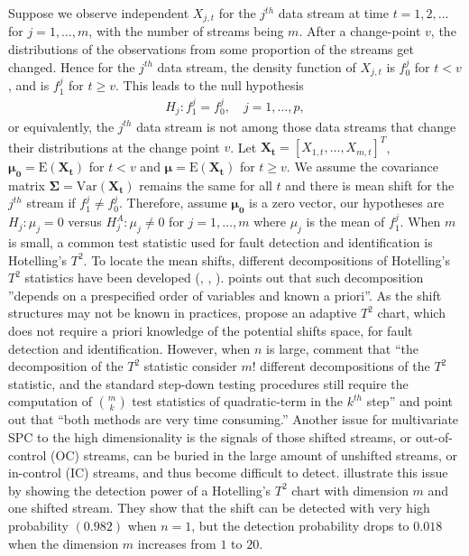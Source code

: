 \documentclass[]{interact}
\theoremstyle{plain}%
\theoremstyle{definition}
\theoremstyle{remark}
\newcommand{\E}{\mathrm{E}}
\newcommand{\Var}{\mathrm{Var}}
\begin{document}
Suppose we observe independent $X_{j,t}$ for the $j^{th}$ data stream at time $t = 1, 2, \ldots $ for $j = 1, \ldots, m$, with the number of streams being $m$. After a change-point $v$, the distributions of the observations from some proportion of the streams get changed. Hence for the $j^{th}$ data stream, the density function of $X_{j,t}$ is $f_0^{j}$ for $t<v$, and is $f_1^j$ for $t \ge v $. This leads to the null hypothesis 
\begin{align}
H_j: f_1^j = f_0^j,\quad j=1,\ldots,p, \label{p Hj}
\end{align}
or equivalently, the $j^{th}$ data stream is not among those data streams that change their distributions at the change point $v$. Let $\mathbf{X_t} = [X_{1,t}, \ldots, X_{m,t}]^T$, $\bm{\mu_0} = \E(\mathbf{X_t})$ for $t<v$ and $\bm{\mu} = \E(\mathbf{X_t})$ for $t\ge v$. We assume the covariance matrix $\bm{\Sigma} = \Var(\mathbf{X_t})$ remains the same for all $t$ and there is mean shift for the $j^{th}$ stream if $f_1^j \ne f_0^j$. Therefore, assume $\bm{\mu_0}$ is a zero vector, our hypotheses are $H_{j}: \mu_{j} = 0$ versus $H_{j}^A: \mu_{j} \ne 0$ for $j = 1, \ldots, m$ where $\mu_j$ is the mean of $f_1^j$. When $m$ is small, a common test statistic used for fault detection and identification is Hotelling's $T^2$. To locate the mean shifts, different decompositions of Hotelling's $T^2$ statistics have been developed (\cite{mason1995decomposition}, \cite{mason1997practical}, \cite{li2008causation}). \cite{zhu2009adaptive} points out that such decomposition ''depends on a prespecified order of variables and known a priori''. As the shift structures may not be known in practices, \cite{zhu2009adaptive} propose an adaptive $T^2$ chart, which does not require a priori knowledge of the potential shifts space, for fault detection and identification. However, when $n$ is large, \cite{li2020diagnostic} comment that 	``the decomposition of the $T^2$ statistic consider $m!$ different decompositions of the $T^2$ statistic, and the standard step-down testing procedures still require the computation of $\binom{m}{k}$ test statistics of quadratic-term in the $k^{th}$ step'' and point out that ``both methods are very time consuming.'' Another issue for multivariate SPC to the high dimensionality is the signals of those shifted streams, or out-of-control (OC) streams, can be buried in the large amount of unshifted streams, or in-control (IC) streams, and thus become difficult to detect. \cite{wang2009high} illustrate this issue by showing the detection power of a Hotelling's $T^2$ chart with dimension $m$ and one shifted stream. They show that the shift can be detected with very high probability $(0.982)$ when $n=1$, but the detection probability drops to $0.018$ when the dimension $m$ increases from $1$ to $20$.
\end{document}
